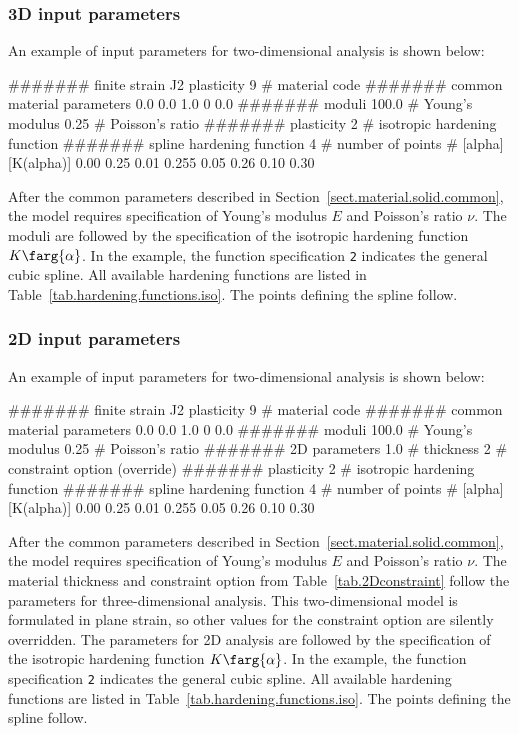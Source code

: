 \subsubsection{3D input parameters}
An example of input parameters for two-dimensional analysis is shown 
below:
\begin{inputfile}
####### finite strain J2 plasticity
 9     # material code
####### common material parameters
0.0    0.0    1.0
0      0.0
####### moduli
100.0 # Young's modulus
0.25  # Poisson's ratio
####### plasticity
2     # isotropic hardening function
####### spline hardening function
4     # number of points
# [alpha] [K(alpha)]
0.00  0.25
0.01  0.255
0.05  0.26
0.10  0.30
\end{inputfile}
After the common parameters described in 
Section~\ref{sect.material.solid.common}, the 
model requires specification of Young's modulus 
$E$ and Poisson's ratio $\nu$. 
The moduli are followed by the specification of the isotropic 
hardening function $K\farg{\alpha}$. In the example, the function specification
\texttt{2} indicates the general 
cubic spline. All available hardening functions are listed in 
Table~\ref{tab.hardening.functions.iso}.
The points defining the spline follow.

\subsubsection{2D input parameters}
An example of input parameters for two-dimensional analysis is shown 
below:
\begin{inputfile}
####### finite strain J2 plasticity
9     # material code
####### common material parameters
0.0    0.0    1.0
0      0.0
####### moduli
100.0 # Young's modulus
0.25  # Poisson's ratio
####### 2D parameters
1.0   # thickness
2     # constraint option (override)
####### plasticity
2     # isotropic hardening function
####### spline hardening function
4     # number of points
# [alpha] [K(alpha)]
0.00  0.25
0.01  0.255
0.05  0.26
0.10  0.30
\end{inputfile}
After the common parameters described in 
Section~\ref{sect.material.solid.common}, the 
model requires specification of Young's modulus 
$E$ and Poisson's ratio $\nu$. 
The material thickness and 
constraint option from Table~\ref{tab.2Dconstraint} 
follow the parameters for three-dimensional analysis.
This two-dimensional model is formulated in plane strain,
so other values for the constraint option are silently
overridden.
The parameters for 2D analysis 
are followed by the specification of the isotropic 
hardening function $K\farg{\alpha}$. In the example, the function specification
\texttt{2} indicates the general 
cubic spline. All available hardening functions are listed in 
Table~\ref{tab.hardening.functions.iso}.
The points defining the spline follow.

